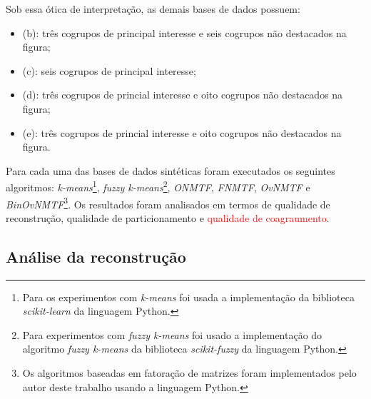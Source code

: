 \documentclass[
    12pt,                %
    oneside,            %
    a4paper,            %
    english,            %
    brazil                %
    ]{abntex2ppgsi}
\begin{document}
Sob essa ótica de interpretação, as demais bases de dados possuem:

\begin{itemize}
\item (b): três cogrupos de principal interesse e seis cogrupos não destacados na figura;
\item (c): seis cogrupos de principal interesse;
\item (d): três cogrupos de princial interesse e oito cogrupos não destacados na figura;
\item (e): três cogrupos de princial interesse e oito cogrupos não destacados na figura.
\end{itemize}


Para cada uma das bases de dados sintéticas foram executados os seguintes algoritmos: \textit{k-means}\footnote{Para os experimentos com \textit{k-means} foi usada a implementação da biblioteca \textit{scikit-learn} \cite{scikitLearn} da linguagem Python.}, \textit{fuzzy k-means}\footnote{Para experimentos com \textit{fuzzy k-means} foi usado a implementação do algoritmo \textit{fuzzy k-means} da biblioteca \textit{scikit-fuzzy} da linguagem Python.}, \textit{ONMTF}, \textit{FNMTF}, \textit{OvNMTF} e \textit{BinOvNMTF}\footnote{Os algoritmos baseadas em fatoração de matrizes foram implementados pelo autor deste trabalho usando a linguagem Python.}. Os resultados foram analisados em termos de qualidade de reconstrução, qualidade de particionamento e \textcolor{red}{qualidade de coagraumento}.


\subsection{Análise da reconstrução}
\end{document}
